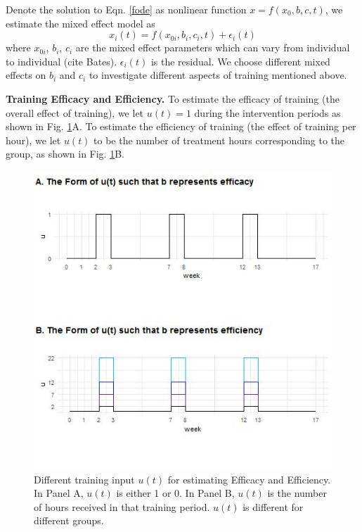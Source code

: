 {	Denote the solution to Eqn. \ref{fode} as nonlinear function $ x=f(x_0,b,c,t) $, we estimate the mixed effect model as
	\begin{equation}\label{eqn:nonlinear}
	x_i (t)=f(x_{0i},b_i,c_i,t) + \epsilon_i (t)
	\end{equation}
	where $ x_{0i} $, $ b_i $, $ c_i $ are the mixed effect parameters which can vary from individual to individual (cite Bates).
	$ \epsilon_i (t) $ is the residual. 
	We choose different mixed effects on $ b_i $ and $ c_i $ to investigate different aspects of training mentioned above.
	
	\textbf{Training Efficacy and Efficiency.}
	To estimate the efficacy of training (the overall effect of training), we let $ u(t)=1 $ during the intervention periods as shown in Fig. \ref{fig:dosefigure2}A. 
	To estimate the efficiency of training (the effect of training per hour), we let $ u(t) $ to be the number of treatment hours corresponding to the group, as shown in Fig. \ref{fig:dosefigure2}B. 
	
	\begin{figure}
		\centering
		\includegraphics[width=0.7\linewidth]{figures/dosefigure2}
		\caption[Efficacy and Efficiency]{Different training input $u(t)$ for estimating Efficacy and Efficiency. In Panel A, $u(t)$ is either 1 or 0. In Panel B, $u(t)$ is the number of hours received in that training period. $u(t)$ is different for different groups.}
		\label{fig:dosefigure2}
	\end{figure}
	
}
